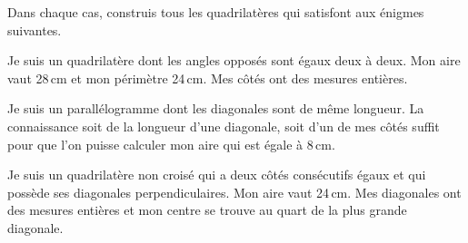\begin{exercice}[]
Dans chaque cas, construis tous les quadrilatères qui satisfont aux énigmes suivantes.

\begin{colenumerate}{1} 
\item Je suis un quadrilatère dont les angles opposés sont égaux deux à deux. Mon aire vaut 28\,cm et mon périmètre 24\,cm. Mes côtés ont des mesures entières.
\item Je suis un parallélogramme dont les diagonales sont de même longueur. La connaissance soit de la longueur d’une diagonale, soit d’un de mes côtés suffit pour que l’on puisse calculer mon aire qui est égale à 8\,cm.
\item Je suis un quadrilatère non croisé qui a deux côtés consécutifs égaux et qui possède ses diagonales perpendiculaires. Mon aire vaut 24\,cm. Mes diagonales ont des mesures entières et mon centre se trouve au quart de la plus grande diagonale.
\end{colenumerate}
\end{exercice}
